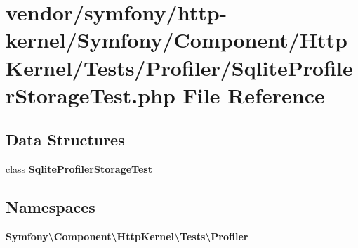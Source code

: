 \section{vendor/symfony/http-\/kernel/\+Symfony/\+Component/\+Http\+Kernel/\+Tests/\+Profiler/\+Sqlite\+Profiler\+Storage\+Test.php File Reference}
\label{_sqlite_profiler_storage_test_8php}
\subsection*{Data Structures}
\begin{DoxyCompactItemize}
\item 
class {\bf Sqlite\+Profiler\+Storage\+Test}
\end{DoxyCompactItemize}
\subsection*{Namespaces}
\begin{DoxyCompactItemize}
\item 
 {\bf Symfony\textbackslash{}\+Component\textbackslash{}\+Http\+Kernel\textbackslash{}\+Tests\textbackslash{}\+Profiler}
\end{DoxyCompactItemize}

